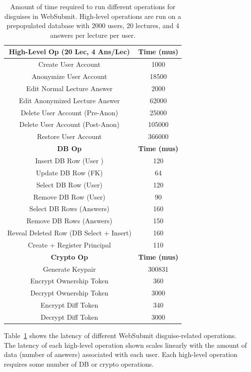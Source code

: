 \begin{table}[t!]
\begin{center}
\begin{tabular}{ c c }
    \textbf{High-Level Op (20 Lec, 4 Ans/Lec)} & \textbf{Time (mus)}\\
\hline
    Create User Account & 1000\\
    Anonymize User Account & 18500\\
    Edit Normal Lecture Answer & 2000 \\
    Edit Anonymized Lecture Answer & 62000 \\
    Delete User Account (Pre-Anon) & 25000 \\
    Delete User Account (Post-Anon) & 105000 \\
    Restore User Account & 366000 \\
\hline
    \textbf{DB Op} & \textbf{Time (mus)}\\
\hline
Insert DB Row (User )& 120\\
Update DB Row (FK) & 64\\ 
Select DB Row (User) & 120\\
Remove DB Row (User) & 90\\
Select DB Rows (Answers) & 160\\
Remove DB Rows (Answers) & 150\\
Reveal Deleted Row (DB Select + Insert) & 160 \\
Create + Register Principal & 110\\
\hline
    \textbf{Crypto Op} & \textbf{Time (mus)}\\
\hline
Generate Keypair & 300831\\
Encrypt Ownership Token & 360\\
Decrypt Ownership Token & 3000\\
Encrypt Diff Token & 340\\
Decrypt Diff Token & 3000\\
\end{tabular}
\end{center}
\caption{Amount of time required to run different operations for disguises in WebSubmit. High-level
    operations are run on a prepopulated database with 2000 users, 20 lectures, and 4 answers per
    lecture per user.}
    \label{tab:opstats}
\end{table}

Table~\ref{tab:opstats} shows the latency of different WebSubmit disguise-related operations. 
The latency of each high-level operation shown scales linearly with the amount
of data (\ie number of answers) associated with each user. Each high-level operation requires some number of DB or crypto operations.

